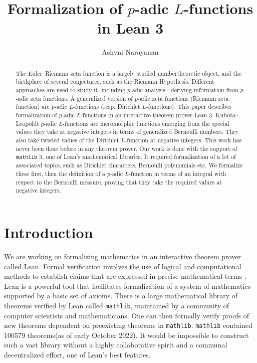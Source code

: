 \documentclass[a4paper,UKenglish,cleveref, autoref, thm-restate]{lipics-v2021}
\title{Formalization of $p$-adic $L$-functions in Lean 3} %
\author{Ashvni Narayanan}{London School of Geometry and Number Theory, Imperial College London}{a.narayanan20@imperial.ac.uk}{https://orcid.org/0000-0003-2777-4228}{EPSRC Grant EP/S021590/1 (UK)}%
\newcommand{\lean}[1]{\texttt{#1}\xspace} %
\begin{document}
\maketitle

\begin{abstract}
The Euler--Riemann zeta function is a largely studied numbertheoretic object, and the birthplace of several conjectures, 
such as the Riemann Hypothesis. Different approaches are used to study it, including $p$-adic analysis : 
deriving information from $p$-adic zeta functions. A generalized version of $p$-adic zeta functions (Riemann zeta function) 
are $p$-adic $L$-functions (resp. Dirichlet $L$-functions). This paper describes formalization of $p$-adic $L$-functions 
in an interactive theorem prover Lean 3. Kubota--Leopoldt $p$-adic $L$-functions are meromorphic functions emerging from the 
special values they take at negative integers in terms of generalized Bernoulli numbers. They also take twisted values of 
the Dirichlet $L$-function at negative integers. This work has never been done before in any theorem prover. 
Our work is done with the support of \lean{mathlib} 3, one of Lean's mathematical libraries. It required formalization of a 
lot of associated topics, such as Dirichlet characters, Bernoulli polynomials etc. We formalize these first, 
then the definition of a $p$-adic $L$-function in terms of an integral with respect to the Bernoulli measure, 
proving that they take the required values at negative integers.
\end{abstract}

\section{Introduction}
We are working on formalizing mathematics in an interactive theorem prover called Lean. 
Formal verification involves the use of logical and computational methods to establish 
claims that are expressed in precise mathematical terms \cite{TPIL}. Lean is a powerful tool 
that facilitates formalization of a system of mathematics supported by a basic set of axioms. There is a large mathematical library of theorems verified by Lean called \lean{mathlib}, maintained by a community of computer scientists and mathematicians. One can then 
formally verify proofs of new theorems dependent on preexisting theorems in \lean{mathlib}. 
\lean{mathlib} contained 100579 theorems(as of early October 2022). It would be impossible to construct 
such a vast library without a highly collaborative spirit and a communal decentralized effort, one of 
Lean's best features. 
\end{document}
